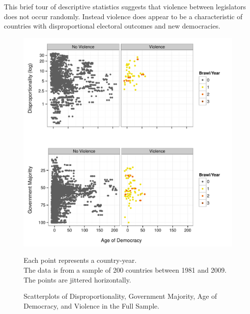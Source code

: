 \documentclass[a4paper]{article}\usepackage{graphicx, color}
\newenvironment{knitrout}{}{} %
\begin{document}
This brief tour of descriptive statistics suggests that violence between legislators does not occur randomly. Instead violence does appear to be a characteristic of countries with disproportional electoral outcomes and new democracies.

\begin{figure}[t]
    \caption{Scatterplots of Disproportionality, Government Majority, Age of Democracy, and Violence in the Full Sample.}  
    \label{framework_empirical}
    \begin{center}

\begin{knitrout}
\color{fgcolor}
\includegraphics[width=0.8\linewidth]{figure/FrameworkEmpirical} 

\end{knitrout}

    \end{center}
    \begin{singlespace}
        {\scriptsize{Each point represents a country-year. \\ The data is from a sample of 200 countries between 1981 and 2009. The points are jittered horizontally.}}
    \end{singlespace}

\end{figure}

\end{document}
